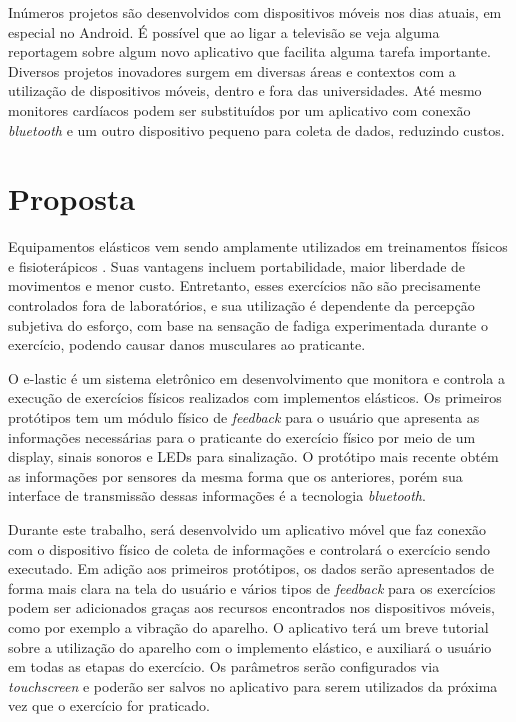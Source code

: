 Inúmeros projetos são desenvolvidos com dispositivos móveis nos dias atuais, em especial no Android. É possível que ao ligar a televisão se veja alguma reportagem sobre algum novo aplicativo que facilita alguma tarefa importante. Diversos projetos inovadores surgem em diversas áreas e contextos com a utilização de dispositivos móveis, dentro e fora das universidades. Até mesmo monitores cardíacos podem ser substituídos por um aplicativo com conexão \textit{bluetooth} e um outro dispositivo pequeno para coleta de dados, reduzindo custos.
\section{Proposta}
Equipamentos elásticos vem sendo amplamente utilizados em treinamentos físicos e fisioterápicos \cite{elasticos}. Suas vantagens incluem portabilidade, maior liberdade de movimentos e menor custo. Entretanto, esses exercícios não são precisamente controlados fora de laboratórios, e sua utilização é dependente da percepção subjetiva do esforço, com base na sensação de fadiga experimentada durante o exercício, podendo causar danos musculares ao praticante.

O e-lastic é um sistema eletrônico em desenvolvimento que monitora e controla a execução de exercícios físicos realizados com implementos elásticos. Os primeiros protótipos tem um módulo físico de \textit{feedback} para o usuário que apresenta as informações necessárias para o praticante do exercício físico por meio de um display, sinais sonoros e LEDs para sinalização. O protótipo mais recente obtém as informações por sensores da mesma forma que os anteriores, porém sua interface de transmissão dessas informações é a tecnologia \textit{bluetooth}.

Durante este trabalho, será desenvolvido um aplicativo móvel que faz conexão com o dispositivo físico de coleta de informações e controlará o exercício sendo executado. Em adição aos primeiros protótipos, os dados serão apresentados de forma mais clara na tela do usuário e vários tipos de \textit{feedback} para os exercícios podem ser adicionados graças aos recursos encontrados nos dispositivos móveis, como por exemplo a vibração do aparelho. O aplicativo terá um breve tutorial sobre a utilização do aparelho com o implemento elástico, e auxiliará o usuário em todas as etapas do exercício. Os parâmetros serão configurados via \textit{touchscreen} e poderão ser salvos no aplicativo para serem utilizados da próxima vez que o exercício for praticado.

